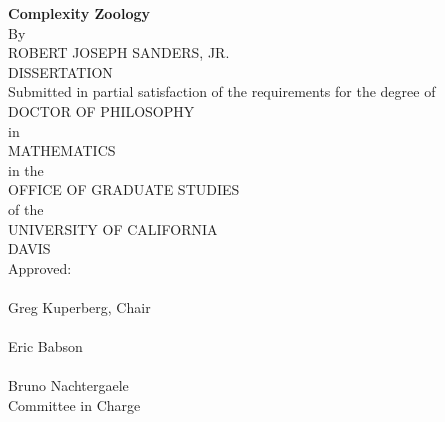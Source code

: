 \begin{center}
   \null\vfill
   \textbf{%
      Complexity Zoology
   }%
   \\
   \bigskip
   By \\
   \bigskip
   ROBERT JOSEPH SANDERS, JR. \\
   \bigskip
   DISSERTATION \\
   \bigskip
   Submitted in partial satisfaction of the requirements for the
   degree of \\
   \bigskip
   DOCTOR OF PHILOSOPHY \\
   \bigskip
   in \\
   \bigskip
   MATHEMATICS \\
   \bigskip
   in the \\
   \bigskip
   OFFICE OF GRADUATE STUDIES \\
   \bigskip        
   of the \\
   \bigskip
   UNIVERSITY OF CALIFORNIA \\
   \bigskip
   DAVIS \\
   \bigskip
   Approved: \\
   \bigskip
   \bigskip
   \makebox[3in]{\hrulefill} \\
   Greg Kuperberg, Chair \\
   \bigskip
   \bigskip
   \makebox[3in]{\hrulefill} \\
   Eric Babson \\
   \bigskip
   \bigskip
   \makebox[3in]{\hrulefill} \\
   Bruno Nachtergaele \\
   \bigskip
   Committee in Charge \\
    \\
   \vfill
\end{center}
